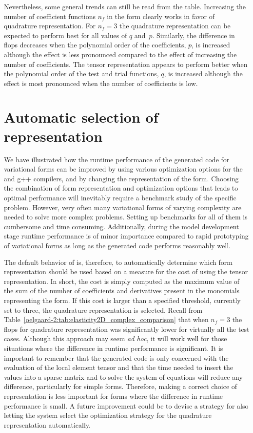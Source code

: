 Nevertheless, some general trends can still be read from the table.
Increasing the number of coefficient functions $n_f$ in the form
clearly works in favor of quadrature representation.  For $n_{f}=3$
the quadrature representation can be expected to perform best for all
values of $q$ and~$p$.  Similarly, the difference in flops decreases
when the polynomial order of the coefficients, $p$, is increased
although the effect is less pronounced compared to the effect of
increasing the number of coefficients.  The tensor representation
appears to perform better when the polynomial order of the test and
trial functions, $q$, is increased although the effect is most
pronounced when the number of coefficients is low.

\section{Automatic selection of representation}

We have illustrated how the runtime performance of the generated code
for variational forms can be improved by using various optimization
options for the \ffc{} and g++ compilers, and by changing the
representation of the form.  Choosing the combination of form
representation and optimization options that leads to optimal
performance will inevitably require a benchmark study of the specific
problem.  However, very often many variational forms of varying
complexity are needed to solve more complex problems. Setting up
benchmarks for all of them is cumbersome and time consuming.
Additionally, during the model development stage runtime performance
is of minor importance compared to rapid prototyping of variational
forms as long as the generated code performs reasonably well.

The default behavior of \ffc{} is, therefore, to automatically
determine which form representation should be used based on a measure
for the cost of using the tensor representation.  In short, the cost
is simply computed as the maximum value of the sum of the number of
coefficients and derivatives present in the monomials representing the
form.  If this cost is larger than a specified threshold, currently
set to three, the quadrature representation is selected.  Recall from
Table~\ref{oelgaard-2:tab:elasticity2D_complex_comparison} that when
$n_f=3$ the flops for quadrature representation was significantly
lower for virtually all the test cases.  Although this approach may
seem \emph{ad hoc}, it will work well for those situations where the
difference in runtime performance is significant.  It is important to
remember that the generated code is only concerned with the evaluation
of the local element tensor and that the time needed to insert the
values into a sparse matrix and to solve the system of equations will
reduce any difference, particularly for simple forms.  Therefore,
making a correct choice of representation is less important for forms
where the difference in runtime performance is small.  A future
improvement could be to devise a strategy for also letting the system
select the optimization strategy for the quadrature representation
automatically.
